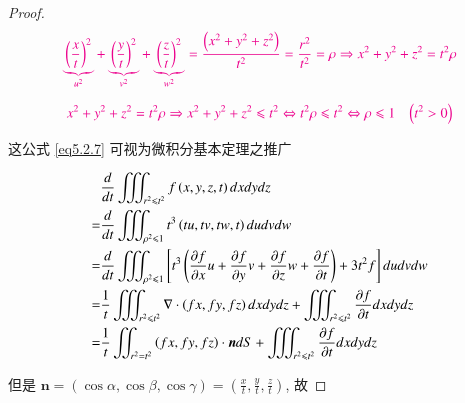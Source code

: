 \documentclass[11pt]{article}
\begin{document}
\begin{proof}
	
	\kaishu 
	
	\begin{equation}
	\color{magenta}
	\underbrace {{{\left( {\frac{x}{t}} \right)}^2}}_{{u^2}} + \underbrace {{{\left( {\frac{y}{t}} \right)}^2}}_{{v^2}} + \underbrace {{{\left( {\frac{z}{t}} \right)}^2}}_{{w^2}} = \frac{{\left( {{x^2} + {y^2} + {z^2}} \right)}}{{{t^2}}} = \frac{{{r^2}}}{{{t^2}}} = \rho  \Rightarrow {x^2} + {y^2} + {z^2} = {t^2}\rho 
	\notag 
	\end{equation}
	
	\vspace{-1cm}
	
	\begin{equation}
	\color{magenta}
	{x^2} + {y^2} + {z^2} = {t^2}\rho  \Rightarrow {x^2} + {y^2} + {z^2} \leqslant {t^2} \Leftrightarrow {t^2}\rho  \leqslant {t^2} \Leftrightarrow \rho  \leqslant 1\;\;\;\left( {{t^2} > 0} \right)
	\notag 
	\end{equation}
	
	这公式 \ref{eq5.2.7} 可视为微积分基本定理之推广
	
	\begin{equation}
	\begin{split}
			& \frac{d}{{dt}}\iiint_{{r^2} \leqslant {t^2}} {f\left( {x,y,z,t} \right)dxdydz}\\
		=   & \frac{d}{{dt}}\iiint_{{\rho ^2} \leqslant 1} {{t^3}\left( {tu,tv,tw,t} \right)dudvdw} \\
		=   & \frac{d}{{dt}}\iiint_{{\rho ^2} \leqslant 1} {\left[ {{t^3}\left( {\frac{{\partial f}}{{\partial x}}u + \frac{{\partial f}}{{\partial y}}v + \frac{{\partial f}}{{\partial z}}w + \frac{{\partial f}}{{\partial t}}} \right) + 3{t^2}f} \right]dudvdw} \\
		=   & \frac{1}{t}\iiint_{{r^2} \leqslant {t^2}} {\nabla  \cdot \left( {fx,fy,fz} \right)dxdydz} + \iiint_{{r^2} \leqslant {t^2}} {\frac{{\partial f}}{{\partial t}}dxdydz}\\
		=   & \frac{1}{t}\iint_{{r^2} = {t^2}} {\left( {fx,fy,fz} \right) \cdot \boldsymbol{n}dS} + \iiint_{{r^2} \leqslant {t^2}} {\frac{{\partial f}}{{\partial t}}dxdydz}
	\end{split}
	\notag 
	\end{equation}
	
	但是 $\boldsymbol{n} = \left( {\cos \alpha ,\cos \beta ,\cos \gamma } \right) = \left( {\frac{x}{t},\frac{y}{t},\frac{z}{t}} \right)$, 故
	

\end{proof}
\end{document}
